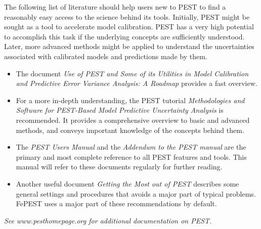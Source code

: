 The following list of literature should help users new to PEST to find a reasonably easy access to the science behind its tools.
Initially, PEST might be sought as a tool to accelerate model calibration. PEST has a very high potential to accomplish this task if the underlying concepts are sufficiently understood. Later, more advanced methods might be applied to understand the uncertainties associated with calibrated models and predictions made by them.

\begin{itemize}
\item The document \textit{Use of PEST and Some of its Utilities in Model Calibration and Predictive Error Variance Analysis: A Roadmap} provides a fast overview.

\item For a more in-depth understanding, the PEST tutorial \textit{Methodologies and Software for PEST-Based Model Predictive Uncertainty Analysis} is recommended. It provides a comprehensive overview to basic and advanced methods, and conveys important knowledge of the concepts behind them.

\item The \textit{PEST Users Manual} and the \textit{Addendum to the PEST manual} are the primary and most complete reference to all PEST features and tools. This manual will refer to these documents regularly for further reading.

\item Another useful document \textit{Getting the Most out of PEST} describes some general settings and procedures that avoids a major part of typical problems. FePEST uses a major part of these recommendations by default.
\end{itemize}

\textit{See www.pesthomepage.org  for additional documentation on PEST.
}